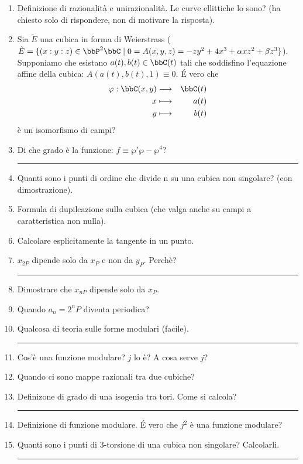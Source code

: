 \begin{enumerate}
\item Definizione di razionalità e unirazionalità. Le curve ellittiche lo sono? (ha chiesto solo di rispondere, non di motivare la risposta).
\item Sia $\tilde E$ una cubica in forma di Weierstrass ($\tilde E= \{ (x:y:z)\in \bbP^{2}\bbC \mid 0=A(x, y, z)=-zy^{2}+4x^{3}+\alpha xz^{2} + \beta z^{3} \}$). Supponiamo che esistano $a(t), b(t) \in \bbC(t)$ tali che soddisfino l'equazione affine della cubica: $A(a(t), b(t), 1) \equiv 0$. \'E vero che 
\begin{alignat*}{2}
	\varphi:\bbC(x,y)&\longrightarrow	&\bbC(t)\\
		x	&\longmapsto		&a(t)\\
		y	&\longmapsto		&b(t)\\
\end{alignat*}
è un isomorfismo di campi?
\item Di che grado è la funzione: $f \equiv \wp '\wp - \wp^{4}$?
\bigskip
\hrule
\bigskip

\item Quanti sono i punti di ordine che divide n su una cubica non singolare? (con dimostrazione).
\item Formula di dupilcazione sulla cubica (che valga anche su campi a caratteristica non nulla).
\item Calcolare esplicitamente la tangente in un punto.
\item $x_{2P}$ dipende solo da $x_{P}$ e non da $y_{P}$. Perchè?
\bigskip
\hrule
\bigskip

\item Dimostrare che $x_{nP}$ dipende solo da $x_{P}$.
\item Quando $a_{n}=2^{n}P$ diventa periodica?
\item Qualcosa di teoria sulle forme modulari (facile).
\bigskip
\hrule
\bigskip

\item Cos'è una funzione modulare? $j$ lo è? A cosa serve $j$?
\item Quando ci sono mappe razionali tra due cubiche?
\item Definizone di grado di una isogenia tra tori. Come si calcola?
\bigskip
\hrule
\bigskip

\item Definizione di funzione modulare. \'E vero che $j^{2}$ è una funzione modulare?
\item Quanti sono i punti di 3-torsione di una cubica non singolare? Calcolarli. 
\bigskip
\hrule
\bigskip


\end{enumerate}
